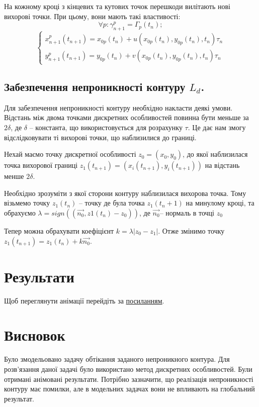 \documentclass[a4paper,12pt]{article}
\begin{document}
	На кожному кроці з кінцевих та кутових точок перешкоди вилітають нові вихорові точки. При цьому, вони мають такі властивості:
	\[
		\forall p: \gamma_{n+1}^{p} = \Gamma_p(t_n);
	\]
	\begin{equation*}
		\begin{cases}
			x_{n+1}^{p}(t_{n+1}) = x_{0p}(t_n) + u(x_{0p}(t_n), y_{0p}(t_n), t_n)\tau_n
			\\
			y_{n+1}^{p}(t_{n+1}) = y_{0p}(t_n) + v(x_{0p}(t_n), y_{0p}(t_n), t_n)\tau_n
		\end{cases}
	\end{equation*}
	
	\subsection{Забезпечення непроникності контуру $L_d$.}
	
		Для забезпечення непроникності контуру необхідно накласти деякі умови. Відстань між двома точками дискретних особливостей повинна бути меньше за $2\delta$, де $\delta$ -- константа, що використовується для розрахунку $\tau$. Це дає нам змогу відслідковувати ті вихорові точки, що наблизилися до границі.
		
		Нехай маємо точку дискретної особливості $z_0 = (x_0, y_0)$, до якої наблизилася точка вихорової границі $z_1(t_{n+1}) = (x_i(t_{n+1}), y_i(t_{n+1}))$ на відстань менше $2 \delta$.
		
		Необхідно зрозуміти з якої сторони контуру наблизилася вихорова точка. Тому візьмемо точку $z_1(t_{n})$ -- точку де була точка $z_1(t_n+1)$ на минулому кроці, та обрахуємо $\lambda = sign \left( (\vec{n_0}, z1(t_n) - z_0) \right)$, де $\vec{n_0}$-- нормаль в точці $z_0$
		
		 Тепер можна обрахувати коефіцієнт $k = \lambda|z_0 - z_1|$. Отже змінимо точку $z_1(t_{n+1}) = z_1(t_n) + k\vec{n_0}$.
		
\section{Результати}
	Щоб переглянути анімації перейдіть за \href{https://github.com/AlKravets/nonclassical-optimization-lab2}{посиланням}.

\section{Висновок}
	Було змодельовано задачу обтікання заданого непроникного контура. Для розв'язання даної задачі було використано метод дискретних особливостей. Були отримані анімовані результати. Потрібно зазначити, що реалізація непроникності контуру має помилки, але в модельних задачах вони не впливають на глобальний результат.
\end{document}
